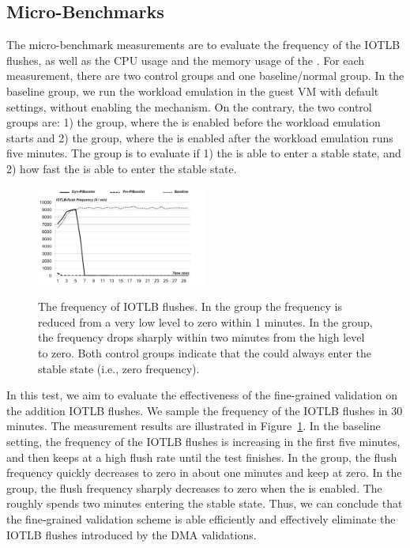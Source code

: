 
\subsection{Micro-Benchmarks}
The micro-benchmark measurements are to evaluate the frequency of the IOTLB flushes, as well as the CPU usage and the memory usage of the \name.
For each measurement, there are two control groups and one baseline/normal group.
In the baseline group, we run the workload emulation in the guest VM with default settings, without enabling the \name mechanism.
On the contrary, the two control groups are: 1) the \prename group, where the \name is enabled before the workload emulation starts and 2) the \dynname group, where the \name is enabled after the workload emulation runs five minutes. The \dynname group is to evaluate if 1) the \name is able to enter a stable state, and 2) how fast the \name is able to enter the stable state.

\begin{figure}[ht]
\centering
\includegraphics[width=0.5\textwidth]{image/micro/iotlbflush.jpg} \\
\caption{The frequency of IOTLB flushes.  In the \prename group the frequency is reduced from a very low level to zero within 1 minutes. In the \dynname group, the frequency drops sharply within two minutes from the high level to zero. Both control groups indicate that the \name could always enter the stable state (i.e., zero frequency).}
\label{fig:iotlbflush}
\end{figure}

In this test, we aim to evaluate the effectiveness of the fine-grained validation on the addition IOTLB flushes.
We sample the frequency of the IOTLB flushes in 30 minutes.
The measurement results are illustrated in Figure~\ref{fig:iotlbflush}.
In the baseline setting, the frequency of the IOTLB flushes is increasing in the first five minutes, and then keeps at a high flush rate until the test finishes.
In the \prename group, the flush frequency quickly decreases to zero in about one minutes and keep at zero.
In the \dynname group, the flush frequency sharply decreases to zero when the \name is enabled. The \name roughly spends two minutes entering the stable state.
Thus, we can conclude that the fine-grained validation scheme is able efficiently and effectively eliminate the IOTLB flushes introduced by the DMA validations.

